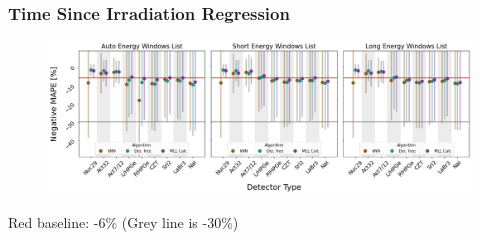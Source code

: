 \begin{frame}
  \frametitle{Time Since Irradiation Regression}
  \begin{adjustwidth}{-15pt}{-10pt}
  \begin{figure}
    \centering
    \includegraphics[width=1.1\textwidth]{./figures/detector_preds_wrt_enlist_MAPE_cool.png}
  \end{figure}
  \vspace{12pt} \centering Red baseline: -6\% (Grey line is -30\%) 
  \end{adjustwidth}
\end{frame}


